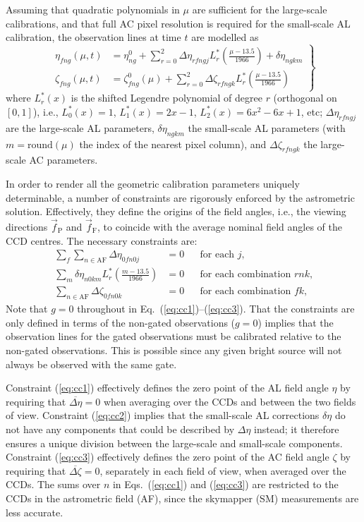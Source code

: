 \documentclass[structabstract]{aa}
\begin{document}
Assuming that quadratic polynomials in $\mu$ are sufficient for the large-scale
calibrations, and that full AC pixel resolution is required for the small-scale
AL calibration, the observation lines at time $t$ are modelled as
\begin{equation}\label{eq:etazeta}
\left.
\begin{aligned}
\eta_{fng}(\mu,t) &= \eta^0_{ng}
+ \sum_{r=0}^2 \Delta\eta_{rfngj} L_r^\ast\left(\frac{\mu-13.5}{1966}\right)
+ \delta\eta_{ngkm}  \\
\zeta_{fng}(\mu,t) &= \zeta^0_{fng}(\mu)
+ \sum_{r=0}^2 \Delta\zeta_{rfngk} L_r^\ast\left(\frac{\mu-13.5}{1966}\right)
\end{aligned}
\right\}
\end{equation}
where $L_r^\ast(x)$ is the shifted Legendre polynomial of degree $r$ (orthogonal
on $[0,1]$), i.e., $L_0^\ast(x)=1$, $L_1^\ast(x)=2x-1$, $L_2^\ast(x)=6x^2-6x+1$, etc;
$\Delta\eta_{rfngj}$ are the large-scale AL parameters, $\delta\eta_{ngkm}$ the
small-scale AL parameters (with $m=\text{round}(\mu)$ the index of the nearest
pixel column), and $\Delta\zeta_{rfngk}$ the large-scale AC parameters.

In order to render all the geometric calibration parameters uniquely determinable,
a number of constraints are rigorously enforced by the astrometric solution.
Effectively, they define the origins of the field angles, i.e., the viewing
directions $\vec{f}_\text{P}$ and $\vec{f}_\text{F}$, to coincide with the
average nominal field angles of the CCD centres. The necessary constraints are:
\begin{align}
\sum_f \sum_{n\in\text{AF}} \Delta\eta_{0fn0j} &= 0
     &&\text{for each $j$,}\label{eq:cc1}\\
\sum_m \delta\eta_{n0km}L_r^\ast\left(\frac{m-13.5}{1966}\right) &= 0
     &&\text{for each combination $rnk$,}\label{eq:cc2}\\
\sum_{n\in\text{AF}} \Delta\zeta_{0fn0k} &= 0
     &&\text{for each combination $fk$,}\label{eq:cc3}
\end{align}
Note that $g=0$ throughout in Eq.~(\ref{eq:cc1})--(\ref{eq:cc3}). 
That the constraints are only defined in terms of the
non-gated observations ($g=0$) implies that the observation lines for the
gated observations must be calibrated relative to the non-gated observations.
This is possible since any given bright source will not always be observed
with the same gate.

Constraint (\ref{eq:cc1}) effectively defines the zero point of the AL
field angle $\eta$ by requiring that $\overline{\Delta\eta}=0$ when
averaging over the CCDs and between the two fields of view.
Constraint (\ref{eq:cc2}) implies that the small-scale AL corrections
$\delta\eta$ do not have any components that could be described by
$\Delta\eta$ instead; it therefore ensures a unique division between
the large-scale and small-scale components. Constraint (\ref{eq:cc3})
effectively defines the zero point of the AC field angle $\zeta$
by requiring that $\overline{\Delta\zeta}=0$, separately in each
field of view, when averaged over the CCDs. The sums over $n$ in
Eqs.~(\ref{eq:cc1}) and (\ref{eq:cc3}) are restricted to the CCDs in
the astrometric field (AF), since the skymapper (SM) measurements are
less accurate.
\end{document}
